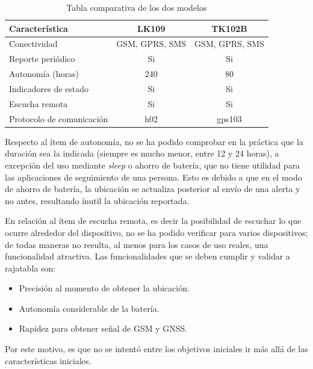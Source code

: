 \begin{table}[h]
	\centering
	\caption[Tabla comparativa]{Tabla comparativa de los dos modelos}
	\begin{tabular}{l c c}    
		\toprule
		\textbf{Característica} 	 & \textbf{LK109} & \textbf{TK102B}	  \\
		\midrule
		Conectividad & GSM, GPRS, SMS & 	GSM, GPRS, SMS			\\		
		Reporte periódico & Si & Si			\\
		Autonomía (horas) & 240 & 80		\\
		Indicadores de estado & Si & Si \\
		Escucha remota & Si & Si \\
		Protocolo de comunicación & h02 & gps103 \\
		\bottomrule
		\hline
	\end{tabular}
	\label{tab:peces}
\end{table}

Respecto al ítem de autonomía, no se ha podido comprobar en la práctica que la duración sea la indicada (siempre es mucho menor, entre 12 y 24 horas), a excepción del uso mediante \textit{sleep} o ahorro de batería, que no tiene utilidad para las aplicaciones de seguimiento de una persona. Esto es debido a que en el modo de ahorro de batería, la ubicación se actualiza posterior al envío de una alerta y no antes, resultando ínutil la ubicación reportada.

En relación al ítem de escucha remota, es decir la posibilidad de escuchar lo que ocurre alrededor del dispositivo, no se ha podido verificar para varios dispositivos; de todas maneras no resulta, al menos para los casos de uso reales, una funcionalidad atractiva. Las funcionalidades que se deben cumplir y validar a rajatabla son:
\begin{itemize}
	\item Precisión al momento de obtener la ubicación.
	\item Autonomía considerable de la batería.
	\item Rapidez para obtener señal de GSM y GNSS.
\end{itemize}

Por este motivo, es que no se intentó entre los objetivos iniciales ir más allá de las características iniciales.